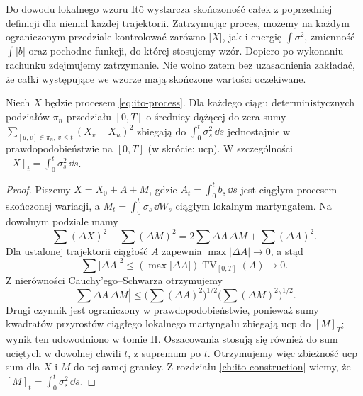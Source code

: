 \begin{uwaga}
Do dowodu lokalnego wzoru Itô wystarcza skończoność całek
z poprzedniej definicji dla niemal każdej trajektorii.
Zatrzymując proces, możemy na każdym ograniczonym przedziale
kontrolować zarówno $|X|$, jak i energię $\int\sigma^2$,
zmienność $\int|b|$ oraz pochodne funkcji, do której
stosujemy wzór. Dopiero po wykonaniu rachunku zdejmujemy
zatrzymanie. Nie wolno zatem bez uzasadnienia zakładać, że
całki występujące we wzorze mają skończone wartości oczekiwane.
\end{uwaga}

\begin{lemat}
\label{lem:ito-qv}
Niech $X$ będzie procesem \eqref{eq:ito-process}. Dla
każdego ciągu deterministycznych podziałów $\pi_n$ przedziału
$[0,T]$ o średnicy dążącej do zera sumy
$\sum_{[u,v]\in\pi_n,\,v\le t}(X_v-X_u)^2$
zbiegają do $\int_0^t\sigma_s^2\,\dd s$ jednostajnie
w prawdopodobieństwie na $[0,T]$ (w skrócie: ucp).
W szczególności $[X]_t=\int_0^t\sigma_s^2\,\dd s$.
\end{lemat}
\begin{proof}
Piszemy $X=X_0+A+M$, gdzie
$A_t=\int_0^tb_s\,\dd s$ jest ciągłym procesem
skończonej wariacji, a $M_t=\int_0^t\sigma_s\,\dd W_s$
ciągłym lokalnym martyngałem. Na dowolnym podziale mamy
\[
\sum(\Delta X)^2-\sum(\Delta M)^2
=2\sum\Delta A\,\Delta M+\sum(\Delta A)^2.
\]
Dla ustalonej trajektorii ciągłość $A$ zapewnia
$\max|\Delta A|\to0$, a stąd
\[
\sum|\Delta A|^2
\le (\max|\Delta A|)\operatorname{TV}_{[0,T]}(A)
\longrightarrow0.
\]
Z nierówności Cauchy'ego--Schwarza otrzymujemy
\[
\left|\sum\Delta A\,\Delta M\right|
\le\Big(\sum(\Delta A)^2\Big)^{1/2}
\Big(\sum(\Delta M)^2\Big)^{1/2}.
\]
Drugi czynnik jest ograniczony w prawdopodobieństwie,
ponieważ sumy kwadratów przyrostów ciągłego lokalnego
martyngału zbiegają ucp do $[M]_T$; wynik ten udowodniono
w tomie II. Oszacowania stosują się również do sum
uciętych w dowolnej chwili $t$, z supremum po $t$.
Otrzymujemy więc zbieżność ucp sum dla $X$ i $M$ do
tej samej granicy. Z rozdziału \ref{ch:ito-construction}
wiemy, że $[M]_t=\int_0^t\sigma_s^2\,\dd s$.
\end{proof}

